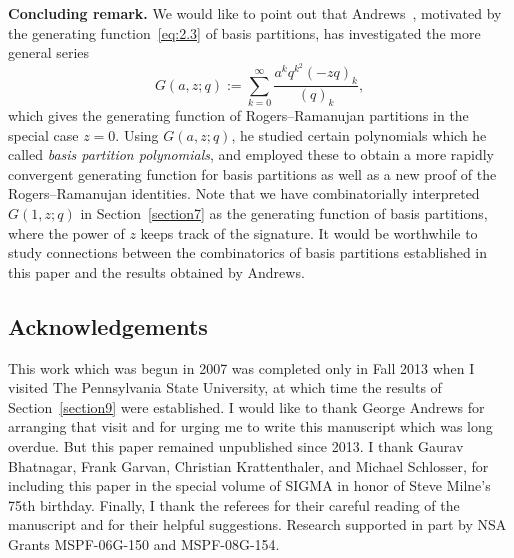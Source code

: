 \documentclass[10pt,a4paper]{amsart}
\numberwithin{equation}{section}
\theoremstyle{definition}
\begin{document}
{\bf Concluding remark.} We would like to point out that
Andrews~\cite{An2015}, motivated by the generating function~\eqref{eq:2.3}
of basis partitions, has investigated the more general series
\begin{equation*}
G(a,z;q):=\sum^{\infty}_{k=0}\frac{a^kq^{k^2}(-zq)_k}{(q)_k},%
\end{equation*}
which gives the generating function of Rogers--Ramanujan partitions in
the special case $z=0$. Using $G(a,z;q)$, he studied certain polynomials
which he called {\it basis partition polynomials}, and employed these
to obtain a more rapidly convergent generating function for basis partitions
as well as a new proof of the Rogers--Ramanujan identities. Note that we
have combinatorially interpreted $G(1,z;q)$ in Section~\ref{section7} as the generating
function of basis partitions, where the power of $z$ keeps track of the
signature. It would be worthwhile to study connections between the
combinatorics of basis partitions established in this paper and the results
obtained by Andrews.



\subsection*{Acknowledgements} This work which was begun in 2007 was completed
only in Fall 2013 when I visited The Pennsylvania State University, at
which time the results of Section~\ref{section9} were established. I would like to thank
George Andrews for arranging that visit and for urging me to write this
manuscript which was long overdue. But this paper remained unpublished
since 2013. I thank Gaurav Bhatnagar, Frank Garvan, Christian Krattenthaler,
and Michael Schlosser, for including this paper in the special volume
of SIGMA in honor of Steve Milne's 75th birthday.
Finally, I thank the referees for their careful reading of the manuscript
and for their helpful suggestions. Research supported in part by NSA Grants MSPF-06G-150 and
MSPF-08G-154.
\end{document}
